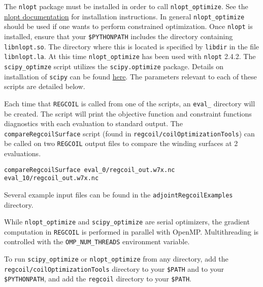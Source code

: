 The \texttt{nlopt} package must be installed in order to call \texttt{nlopt\_optimize}. See the \href{https://nlopt.readthedocs.io/en/latest/#download-and-installation}{nlopt documentation} for installation instructions. In general \texttt{nlopt\_optimize} should be used if one wants to perform constrained optimization. Once \texttt{nlopt} is installed, ensure that your \texttt{\$PYTHONPATH} includes the directory containing \texttt{libnlopt.so}. The directory where this is located is specified by \texttt{libdir} in the file \texttt{libnlopt.la}. At this time \texttt{nlopt\_optimize} has been used with \texttt{nlopt} 2.4.2. The \texttt{scipy\_optimze} script utilizes the \texttt{scipy.optimize} package. Details on installation of \texttt{scipy} can be found \href{https://scipy.org/install.html}{here}. The parameters relevant to each of these scripts are detailed below. 

Each time that \texttt{REGCOIL} is called from one of the scripts, an \texttt{eval\_} directory will be created. The script will print the objective function and constraint functions diagnostics with each evaluation to standard output. The \texttt{compareRegcoilSurface} script (found in \texttt{regcoil/coilOptimizationTools}) can be called on two \texttt{REGCOIL} output files to compare the winding surfaces at 2 evaluations.
\begin{verbatim}
compareRegcoilSurface eval_0/regcoil_out.w7x.nc eval_10/regcoil_out.w7x.nc
\end{verbatim}
Several example input files can be found in the \texttt{adjointRegcoilExamples} directory.

While \texttt{nlopt\_optimize} and \texttt{scipy\_optimize} are serial optimizers, the gradient computation in \texttt{REGCOIL} is performed in parallel with OpenMP. Multithreading is controlled with the \texttt{OMP\_NUM\_THREADS} environment variable.

To run \texttt{scipy\_optimize} or \texttt{nlopt\_optimize} from any directory, add the \\ \texttt{regcoil/coilOptimizationTools} directory to your \texttt{\$PATH} and to your \texttt{\$PYTHONPATH}, and add the \texttt{regcoil} directory to your \texttt{\$PATH}.

